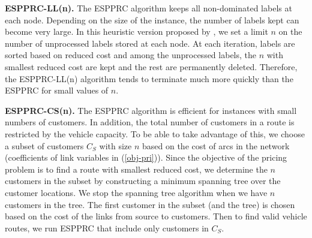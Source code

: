 {\bf ESPPRC-LL(n).} The ESPPRC algorithm keeps all non-dominated labels
at each node. Depending on the size of the instance, the number of labels 
kept can become very large. 
In this heuristic version proposed by \citet{Dumitrescu}, we set a limit $n$ on the number of
unprocessed labels stored at each node. At each iteration, labels are
sorted based on reduced cost and among the unprocessed labels, the
$n$ with smallest reduced cost are kept and the rest are permanently
deleted. Therefore, the ESPPRC-LL(n) algorithm tends to terminate much
more quickly than the ESPPRC for small values of $n$.

{\bf ESPPRC-CS(n).} The ESPPRC algorithm is efficient for instances
with small numbers of customers. In addition, the total number of
customers in a route is restricted by the vehicle capacity. To be able
to take advantage of this, we choose a subset of customers $C_S$ with
size $n$ based on the cost of arcs in the network 
(coefficients of link variables in (\ref{obj-pri})).  Since the
objective of the pricing problem is to find a route with smallest
reduced cost, we determine the $n$ customers in the subset by
constructing a minimum spanning tree over the customer locations. We stop
the spanning tree algorithm when we have $n$ customers in the tree.
The first customer in the subset (and the tree) is chosen based on the
cost of the links from source to customers. Then to find valid vehicle
routes, we run ESPPRC that include only customers in $C_S$.

